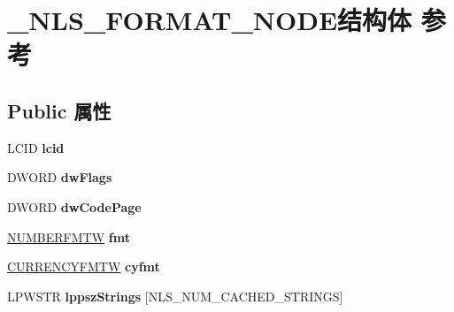 \hypertarget{struct___n_l_s___f_o_r_m_a_t___n_o_d_e}{}\section{\+\_\+\+N\+L\+S\+\_\+\+F\+O\+R\+M\+A\+T\+\_\+\+N\+O\+D\+E结构体 参考}
\label{struct___n_l_s___f_o_r_m_a_t___n_o_d_e}
\subsection*{Public 属性}
\begin{DoxyCompactItemize}
\item 
\mbox{\label{struct___n_l_s___f_o_r_m_a_t___n_o_d_e_a2390dd1ea87b758681d9d85b73cca1ca}} 
L\+C\+ID {\bfseries lcid}
\item 
\mbox{\label{struct___n_l_s___f_o_r_m_a_t___n_o_d_e_a428f6acc786672a9d799fab71b93bc21}} 
D\+W\+O\+RD {\bfseries dw\+Flags}
\item 
\mbox{\label{struct___n_l_s___f_o_r_m_a_t___n_o_d_e_a2f81c703d8dc02fc14b8b767e867c68e}} 
D\+W\+O\+RD {\bfseries dw\+Code\+Page}
\item 
\mbox{\label{struct___n_l_s___f_o_r_m_a_t___n_o_d_e_ac07d66cc58c75519b2862b23a98df510}} 
\hyperlink{struct__numberfmt_w}{N\+U\+M\+B\+E\+R\+F\+M\+TW} {\bfseries fmt}
\item 
\mbox{\label{struct___n_l_s___f_o_r_m_a_t___n_o_d_e_a4227b1ff8d50eb83251c5f52fc699c8b}} 
\hyperlink{struct__currencyfmt_w}{C\+U\+R\+R\+E\+N\+C\+Y\+F\+M\+TW} {\bfseries cyfmt}
\item 
\mbox{\label{struct___n_l_s___f_o_r_m_a_t___n_o_d_e_afbdf20d1e3151b9afa816079c24efddd}} 
L\+P\+W\+S\+TR {\bfseries lppsz\+Strings} \mbox{[}N\+L\+S\+\_\+\+N\+U\+M\+\_\+\+C\+A\+C\+H\+E\+D\+\_\+\+S\+T\+R\+I\+N\+GS\mbox{]}
\item 
\mbox{\label{struct___n_l_s___f_o_r_m_a_t___n_o_d_e_a6ed7bbd53641a05d03fc234295ea74c5}} 

\end{DoxyCompactItemize}

